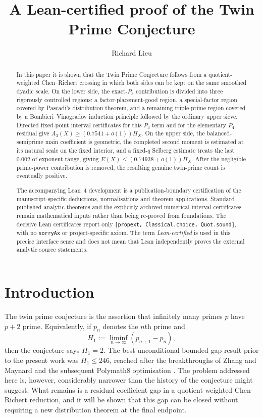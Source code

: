 \documentclass{aomart}
\title{A Lean-certified proof of the Twin Prime Conjecture}
\author{Richard Lieu}
\date{}
\theoremstyle{definition}
\newcommand{\1}{\mathbf 1}
\begin{document}
\begin{abstract}
In this paper it is shown that the Twin Prime Conjecture follows from a quotient-weighted Chen--Richert crossing in which both sides can be kept on the same smoothed dyadic scale.  On the lower side, the exact-$P_3$ contribution is divided into three rigorously controlled regions: a factor-placement-good region, a special-factor region covered by Pascadi's distribution theorem, and a remaining triple-prime region covered by a Bombieri--Vinogradov induction principle followed by the ordinary upper sieve.  Directed fixed-point interval certificates for this $P_3$ term and for the elementary $P_4$ residual give
\(A_3(X)\ge(0.7541+o(1))H_X\).
On the upper side, the balanced-semiprime main coefficient is geometric, the completed second moment is estimated at its natural scale on the fixed interior, and a fixed-$q$ Selberg estimate treats the last $0.002$ of exponent range, giving
\(E(X)\le(0.74938+o(1))H_X\).
After the negligible prime-power contribution is removed, the resulting genuine twin-prime count is eventually positive.

The accompanying Lean~4 development is a publication-boundary certification of the manuscript-specific deductions, normalisations and theorem applications.  Standard published analytic theorems and the explicitly archived numerical interval certificates remain mathematical inputs rather than being re-proved from foundations.  The decisive Lean certificates report only \texttt{[propext, Classical.choice, Quot.sound]}, with no \texttt{sorryAx} or project-specific axiom.  The term \emph{Lean-certified} is used in this precise interface sense and does not mean that Lean independently proves the external analytic source statements.
\end{abstract}

\maketitle

\section{Introduction}

The twin prime conjecture is the assertion that infinitely many primes $p$ have $p+2$ prime.  Equivalently, if $p_n$ denotes the $n$th prime and
\[
 H_1:=\liminf_{n\to\infty}(p_{n+1}-p_n),
\]
then the conjecture says $H_1=2$.  The best unconditional bounded-gap result prior to the present work was $H_1\le246$, reached after the breakthroughs of Zhang and Maynard and the subsequent Polymath8 optimisation \cite{Zhang2014,Maynard2015,Polymath2014}.  The problem addressed here is, however, considerably narrower than the history of the conjecture might suggest.  What remains is a residual coefficient gap in a quotient-weighted Chen--Richert reduction, and it will be shown that this gap can be closed without requiring a new distribution theorem at the final endpoint.
\end{document}
